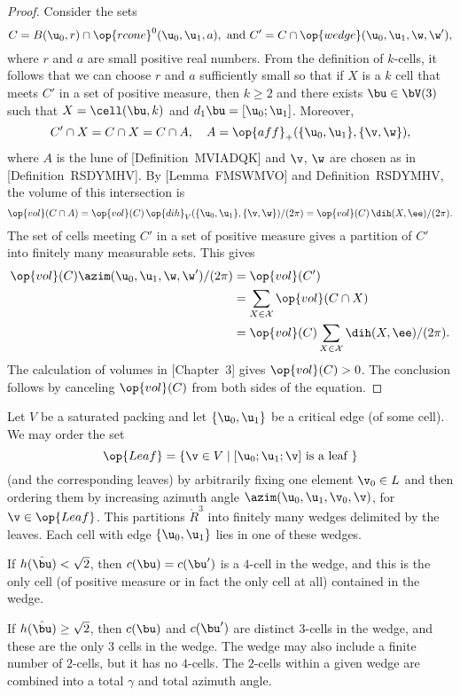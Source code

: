 \begin{proof} 
  Consider the sets
\[
C=B(\u_0,r)\cap \op{rcone}^0(\u_0,\u_1,a),\text{ and } C' = C\cap \op{wedge}(\u_0,\u_1,\w,\w') ,
\]
 where
  $r$ and $a$ are small positive real numbers.  From the definition of
  $k$-cells, it follows that we can choose $r$ and $a$ sufficiently
  small so that if $X$ is a $k$ cell that meets $C'$ in a set of
  positive measure, then $k\ge 2$ and there exists $\bu\in \bV(3)$
  such that $X=\cell(\bu,k)$ and $d_1\bu=[\u_0;\u_1]$.  Moreover,
\[
C'\cap X = C\cap X = C\cap A, \quad A=\op{aff}_+(\{\u_0,\u_1\},\{\v,\w\}),
\]
where $A$ is the lune of \cite{DSP}[Definition~MVIADQK] and $\v$, $\w$ are
chosen as in \cite{DSP}[Definition~RSDYMHV].  By
\cite{DSP}[Lemma~FMSWMVO] and Definition~RSDYMHV, the volume
of this intersection is
\[
\op{vol}(C\cap A) = \op{vol}(C)\,
 {\op{dih}_V(\{\u_0,\u_1\},\{\v,\w\}) }/{(2\pi)} =
  \op{vol}(C)\, {\dih(X,\ee)}/{(2\pi)}.
\]
The set of cells meeting $C'$ in a set of positive measure gives a 
partition of $C'$ into finitely many measurable sets.
This gives
\begin{align*}
\op{vol}(C) \azim(\u_0,\u_1,\w,\w')/(2\pi) &= 
\op{vol}(C') \\
&= \sum_{X\in\cX} \op{vol}(C\cap X)  \\
&= \op{vol}(C)\sum_{X\in\cX} \dih(X,\ee)/(2\pi).
\end{align*}
The calculation of volumes in \cite{DSP}[Chapter~3] gives
$\op{vol}(C)>0$.  The conclusion follows by canceling $\op{vol}(C)$
from both sides of the equation.
\end{proof}



Let $V$ be a saturated packing and let $\{\u_0,\u_1\}$ be a critical edge (of some cell).
We may order the set 
\[
\op{Leaf} = \{ \v\in V \mid [\u_0;\u_1;\v] \text{ is a leaf } \}
\]
(and the corresponding leaves)
by arbitrarily fixing one element $\v_0\in L$ and then ordering them by increasing
azimuth angle $\azim(\u_0,\u_1,\v_0,\v)$, for $\v\in \op{Leaf}$.  This partitions $\ring{R}^3$ into
finitely many wedges delimited by the leaves.  Each cell with edge $\{\u_0,\u_1\}$ lies in one of these
wedges.    

If $h(\hat\bu) < \sqrt2$, then $c(\bu)=c(\bu')$ is a $4$-cell in the wedge,
 and this is the only cell  (of positive measure or in fact the only cell at all)
contained in the wedge.

If $h(\hat\bu)\ge\sqrt2$, then $c(\bu)$ and $c(\bu')$ are distinct $3$-cells in the wedge,
and these are the only $3$ cells in the wedge.  The wedge may also include a finite number of 
$2$-cells, but it has no $4$-cells.  The $2$-cells within a given wedge are combined into a 
total $\gamma$ and total azimuth angle.

